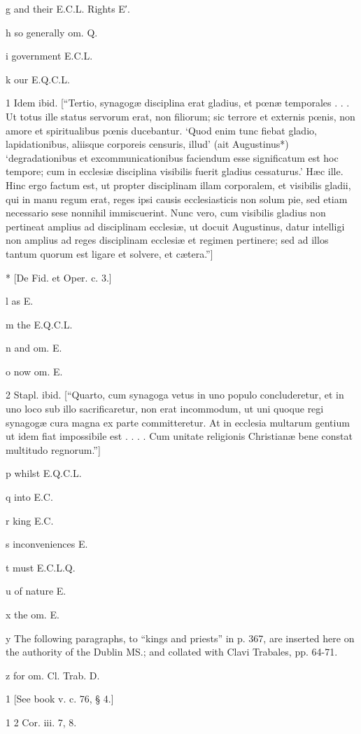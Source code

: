 g
and their E.C.L. Rights E′.

h
so generally om. Q.

i
government E.C.L.

k
our E.Q.C.L.

1
Idem ibid. [“Tertio, synagogæ disciplina erat gladius, et pœnæ temporales . . . Ut totus ille status servorum erat, non filiorum; sic terrore et externis pœnis, non amore et spiritualibus pœnis ducebantur. ‘Quod enim tunc fiebat gladio, lapidationibus, aliisque corporeis censuris, illud’ (ait Augustinus*) ‘degradationibus et excommunicationibus faciendum esse significatum est hoc tempore; cum in ecclesiæ disciplina visibilis fuerit gladius cessaturus.’ Hæc ille. Hinc ergo factum est, ut propter disciplinam illam corporalem, et visibilis gladii, qui in manu regum erat, reges ipsi causis ecclesiasticis non solum pie, sed etiam necessario sese nonnihil immiscuerint. Nunc vero, cum visibilis gladius non pertineat amplius ad disciplinam ecclesiæ, ut docuit Augustinus, datur intelligi non amplius ad reges disciplinam ecclesiæ et regimen pertinere; sed ad illos tantum quorum est ligare et solvere, et cætera.”]

*
[De Fid. et Oper. c. 3.]

l
as E.

m
the E.Q.C.L.

n
and om. E.

o
now om. E.

2
Stapl. ibid. [“Quarto, cum synagoga vetus in uno populo concluderetur, et in uno loco sub illo sacrificaretur, non erat incommodum, ut uni quoque regi synagogæ cura magna ex parte committeretur. At in ecclesia multarum gentium ut idem fiat impossibile est . . . . Cum unitate religionis Christianæ bene constat multitudo regnorum.”]

p
whilst E.Q.C.L.

q
into E.C.

r
king E.C.

s
inconveniences E.

t
must E.C.L.Q.

u
of nature E.

x
the om. E.

y
The following paragraphs, to “kings and priests” in p. 367, are inserted here on the authority of the Dublin MS.; and collated with Clavi Trabales, pp. 64-71.

z
for om. Cl. Trab. D.

1
[See book v. c. 76, § 4.]

1
2 Cor. iii. 7, 8.

